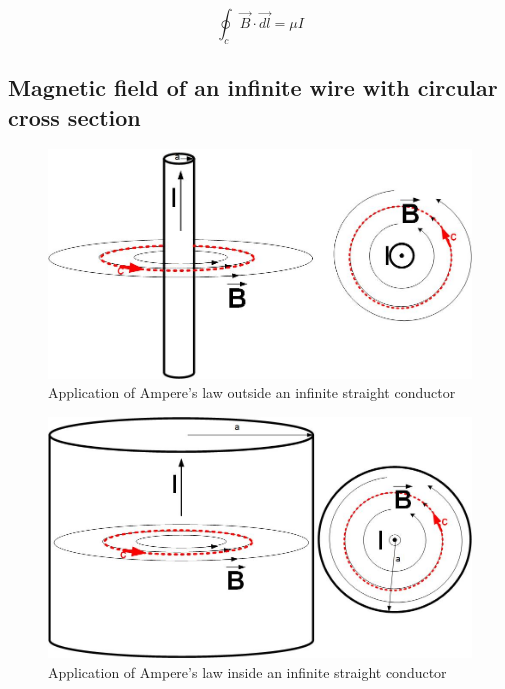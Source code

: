 \documentclass{ximera}
\begin{document}
\begin{equation}
\oint_c \vec{B} \cdot \vec{dl} = \mu I
\end{equation}



\begin{example}
\subsection{Magnetic field of an infinite wire with circular cross section}





\begin{figure}[htbp]
\begin{center}
\includegraphics[scale=0.5]{../jpg/Ampere's_Law1.jpg}
\end{center}
\caption{Application of Ampere's law outside an infinite straight conductor}
\label{MutualInduc}
\end{figure}




\begin{figure}[htbp]
\begin{center}
\includegraphics[scale=0.5]{../jpg/Ampere's_Law2.jpg}
\end{center}
\caption{Application of Ampere's law inside an infinite straight conductor}
\label{MutualInduc}
\end{figure}




\end{example}
\end{document}
